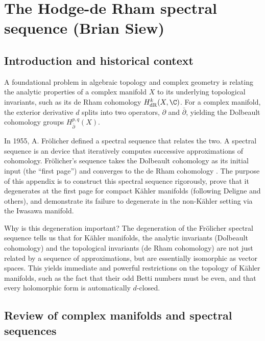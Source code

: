 \section{The Hodge-de Rham spectral sequence (Brian Siew)}

\subsection{Introduction and historical context}

A foundational problem in algebraic topology and complex geometry is relating the analytic properties of a complex manifold $X$ to its underlying topological invariants, such as its de Rham cohomology $H^k_\mathrm{dR}(X, \C)$. For a complex manifold, the exterior derivative $d$ splits into two operators, $\partial$ and $\bar\partial$, yielding the Dolbeault cohomology groups $H^{p,q}_{\bar{\partial}}(X)$.

\medskip

\noindent In 1955, A. Fr\"olicher defined a spectral sequence that relates the two. A spectral sequence is an device that iteratively computes successive approximations of cohomology. Fr\"olicher's sequence takes the Dolbeault cohomology as its initial input (the ``first page'') and converges to the de Rham cohomology \cite{Frolicher1955}. The purpose of this appendix is to construct this spectral sequence rigorously, prove that it degenerates at the first page for compact K\"ahler manifolds (following Deligne and others), and demonstrate its failure to degenerate in the non-K\"ahler setting via the Iwasawa manifold.

\medskip

\noindent Why is this degeneration important? The degeneration of the Fr\"olicher spectral sequence tells us that for K\"ahler manifolds, the analytic invariants (Dolbeault cohomology) and the topological invariants (de Rham cohomology) are not just related by a sequence of approximations, but are essentially isomorphic as vector spaces. This yields immediate and powerful restrictions on the topology of K\"ahler manifolds, such as the fact that their odd Betti numbers must be even, and that every holomorphic form is automatically $d$-closed.

\subsection{Review of complex manifolds and spectral sequences}


